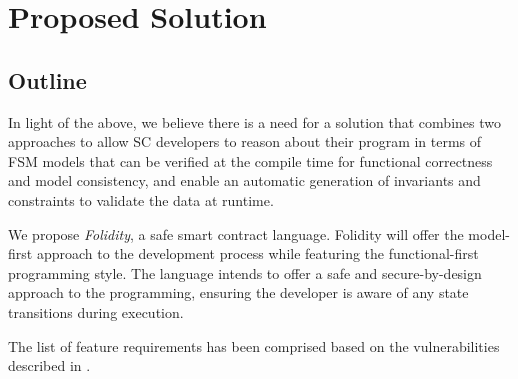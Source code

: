 \documentclass[oneside]{ecsproject}     %
\begin{document}

\chapter{Proposed Solution} \label{Chapter:Solution}

\section{Outline}

In light of the above, we believe there is a need for a solution that combines two approaches to allow SC developers to reason
about their program in terms of FSM models that can be verified at the compile time for functional correctness and model consistency,
and enable an automatic generation of invariants and constraints to validate the data at runtime.

We propose \textit{Folidity}, a safe smart contract language. Folidity will offer the model-first approach to the development process
while featuring the functional-first programming style. The language intends to offer a safe and secure-by-design approach to the programming, 
ensuring the developer is aware of any state transitions during execution.

The list of feature requirements has been comprised based on the vulnerabilities described in .
\end{document}

